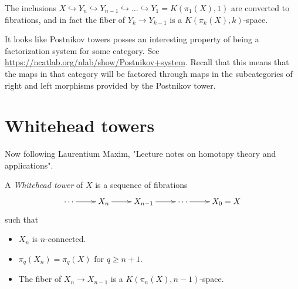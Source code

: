 The inclusions 
$X\hookrightarrow Y_{n}\hookrightarrow Y_{n-1}\hookrightarrow
\ldots\hookrightarrow Y_{1}=K(\pi_{1}(X),1)$
 are converted to fibrations, 
and in fact the fiber of $Y_{k}\to Y_{k-1}$ is a $K(\pi_{k}(X),k)$-space.

\begin{remark}
\label{remark-Postnikov-towers-are-some-kind-of-factorization}
It looks like Postnikov towers posses an interesting property
of being a factorization system for some category.
See \url{https://ncatlab.org/nlab/show/Postnikov+system}.
Recall that this means that the maps in that category
will be factored through maps in the subcategories of right
and left morphisms provided by the Postnikov tower.
\end{remark}


\section{Whitehead towers}

Now following Laurentium Maxim, 
"Lecture notes on homotopy theory and applications".

\begin{definition}
A {\it Whitehead tower} of $X$ is a sequence of fibrations
$$
\xymatrix{
\cdots\ar[r]&X_n\ar[r]&X_{n-1}\ar[r]&\cdots
\ar[r]&X_0=X
}
$$
such that
\begin{itemize}
\item $X_n$ is $n$-connected.
\item $\pi_{q}(X_{n})=\pi_{q}(X)$ for $q\geq n+1$.
\item The fiber of $X_n\to  X_{n-1}$ is a $K(\pi_{n}(X),n-1)$-space.
\end{itemize}
\end{definition}

